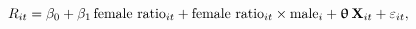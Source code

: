 \begin{equation}\label{equationX}
	R_{it}=\beta_0+\beta_1\,\text{female ratio}_{it}+\text{female ratio}_{it}\times\text{male}_i+\bm\uptheta\,\mathbf{X}_{it}+\varepsilon_{it},
\end{equation}